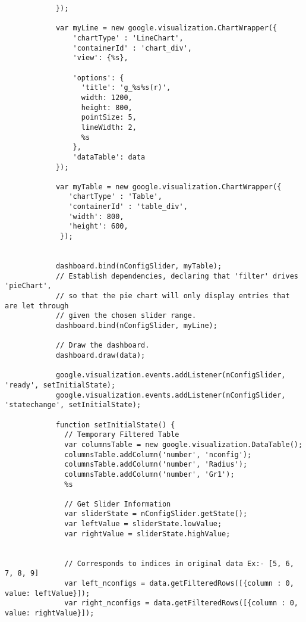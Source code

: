 \begin{verbatim}
            });
            
            var myLine = new google.visualization.ChartWrapper({
                'chartType' : 'LineChart',
                'containerId' : 'chart_div',
                'view': {%s},

                'options': {
                  'title': 'g_%s%s(r)',
                  width: 1200, 
                  height: 800, 
                  pointSize: 5, 
                  lineWidth: 2,
                  %s
                },
                'dataTable': data
            });
           
            var myTable = new google.visualization.ChartWrapper({
               'chartType' : 'Table',
               'containerId' : 'table_div',
               'width': 800,
               'height': 600,
             });
             
            
            dashboard.bind(nConfigSlider, myTable);
            // Establish dependencies, declaring that 'filter' drives 'pieChart',
            // so that the pie chart will only display entries that are let through
            // given the chosen slider range.
            dashboard.bind(nConfigSlider, myLine);

            // Draw the dashboard.
            dashboard.draw(data);
            
            google.visualization.events.addListener(nConfigSlider, 'ready', setInitialState);
            google.visualization.events.addListener(nConfigSlider, 'statechange', setInitialState);
            
            function setInitialState() {
              // Temporary Filtered Table
              var columnsTable = new google.visualization.DataTable();
              columnsTable.addColumn('number', 'nconfig');
              columnsTable.addColumn('number', 'Radius');
              columnsTable.addColumn('number', 'Gr1');
              %s
              
              // Get Slider Information
              var sliderState = nConfigSlider.getState();
              var leftValue = sliderState.lowValue;
              var rightValue = sliderState.highValue;
              
            
              // Corresponds to indices in original data Ex:- [5, 6, 7, 8, 9]
              var left_nconfigs = data.getFilteredRows([{column : 0, value: leftValue}]);
              var right_nconfigs = data.getFilteredRows([{column : 0, value: rightValue}]);
              

\end{verbatim}
